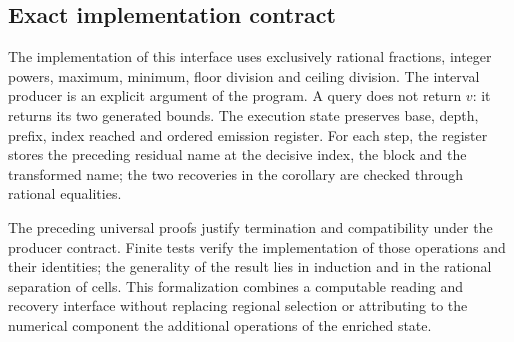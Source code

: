 \subsection{Exact implementation contract}
\label{subsec:residual-implementacion}

The implementation of this interface uses exclusively rational
fractions, integer powers, maximum, minimum, floor division and ceiling
division. The interval producer is an explicit argument of the
program. A query does not return \(v\): it returns its two generated bounds.
The execution state preserves base, depth, prefix, index reached
and ordered emission register. For each step, the register stores the
preceding residual name at the decisive index, the block and the transformed
name; the two recoveries in the corollary are checked through
rational equalities.

The preceding universal proofs justify termination and
compatibility under the producer contract. Finite tests verify
the implementation of those operations and their identities; the generality
of the result lies in induction and in the rational separation of cells.
This formalization combines a computable reading and recovery interface
without replacing regional selection or attributing to the numerical component
the additional operations of the enriched state.
